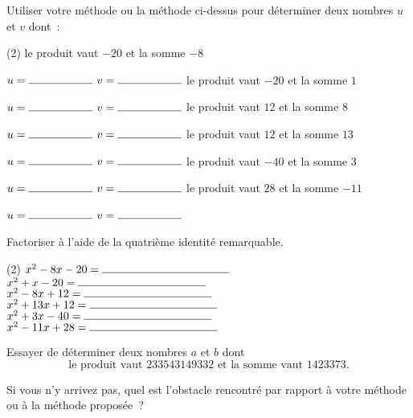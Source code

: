 \documentclass[a4paper,12pt]{report}
\begin{document}
\begin{exo}
	Utiliser votre méthode ou la méthode ci-dessus pour déterminer deux nombres $u$ et $v$ dont~:
	\begin{tasks}(2)
\task le produit vaut $-20$ et la somme $-8$

\vspace{15pt}
$u=\ligne{2}$ $v=\ligne{2}$
\task le produit vaut $-20$ et la somme $1$

\vspace{15pt}
$u=\ligne{2}$ $v=\ligne{2}$
\task le produit vaut $12$ et la somme $8$

\vspace{15pt}
$u=\ligne{2}$ $v=\ligne{2}$
\task le produit vaut $12$ et la somme $13$

\vspace{15pt}
$u=\ligne{2}$ $v=\ligne{2}$
\task le produit vaut $-40$ et la somme $3$

\vspace{15pt}
$u=\ligne{2}$ $v=\ligne{2}$
\task le produit vaut $28$ et la somme $-11$

\vspace{15pt}
$u=\ligne{2}$ $v=\ligne{2}$
	
\end{tasks}
\end{exo}
\begin{exo}
	Factoriser à l'aide de la quatrième identité remarquable.
	\begin{tasks}(2)
\task $x^2-8x-20=\ligne{4}$
\task $x^2+x-20=\ligne{4}$
\task $x^2-8x+12=\ligne{4}$
\task $x^2+13x+12=\ligne{4}$
\task $x^2+3x-40=\ligne{4}$
\task $x^2-11x+28=\ligne{4}$	
\end{tasks}
\end{exo}
\begin{exo}
Essayer de déterminer deux nombres $a$ et $b$ dont \[\text{le produit vaut } 233543149332 \text{ et la somme vaut } 1423373.\]
\end{exo}
Si vous n'y arrivez pas, quel est l'obstacle rencontré par rapport à votre méthode ou à la méthode proposée~?

	\vspace{15pt}
	\myrulefill
	\vspace{15pt}

	\myrulefill
	\vspace{15pt}

	\myrulefill
	\vspace{15pt}


	\myrulefill
	\vspace{15pt}
\end{document}

